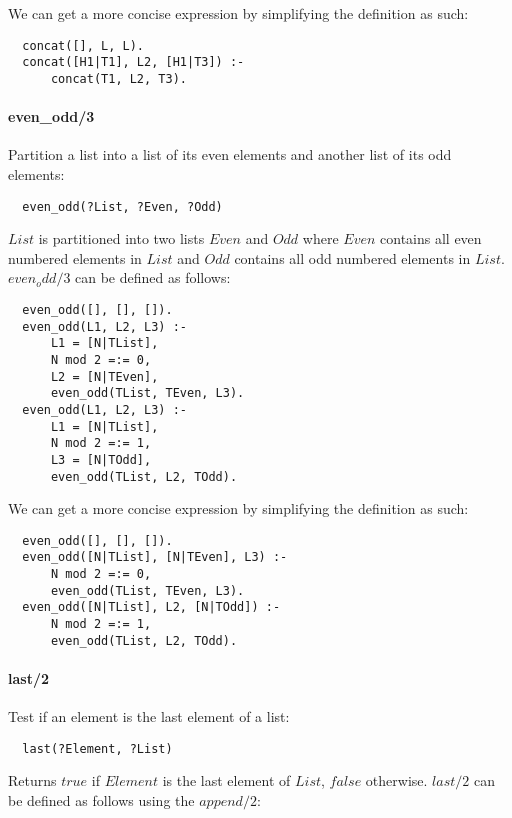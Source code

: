 \documentclass{article}
\begin{document}
\begin{multicols}{2}
  We can get a more concise expression by simplifying the definition as such:

  \begin{lstlisting}
  concat([], L, L).
  concat([H1|T1], L2, [H1|T3]) :- 
      concat(T1, L2, T3).
  \end{lstlisting}
  
  \paragraph{even\_odd/3} Partition a list into a list of its even elements and another list of its odd elements:
  
  \begin{lstlisting}
  even_odd(?List, ?Even, ?Odd)
  \end{lstlisting} 
  
  $List$ is partitioned into two lists $Even$ and $Odd$ where $Even$ contains all even numbered elements in $List$ and $Odd$ contains all odd numbered elements in $List$. $even_odd/3$ can be defined as follows:

  \begin{lstlisting}
  even_odd([], [], []).
  even_odd(L1, L2, L3) :- 
      L1 = [N|TList],
      N mod 2 =:= 0,
	  L2 = [N|TEven],
      even_odd(TList, TEven, L3).
  even_odd(L1, L2, L3) :- 
      L1 = [N|TList],
      N mod 2 =:= 1,
	  L3 = [N|TOdd],
      even_odd(TList, L2, TOdd).
  \end{lstlisting} 
  
  We can get a more concise expression by simplifying the definition as such:

  \begin{lstlisting}
  even_odd([], [], []).
  even_odd([N|TList], [N|TEven], L3) :- 
      N mod 2 =:= 0,
      even_odd(TList, TEven, L3).
  even_odd([N|TList], L2, [N|TOdd]) :- 
      N mod 2 =:= 1,
      even_odd(TList, L2, TOdd).
  \end{lstlisting} 
  
  \paragraph{last/2} Test if an element is the last element of a list:
  
  \begin{lstlisting}
  last(?Element, ?List)
  \end{lstlisting} 
  
  Returns $true$ if $Element$ is the last element of $List$, $false$ otherwise. $last/2$ can be defined as follows using the $append/2$:
  

\end{multicols}
\end{document}
